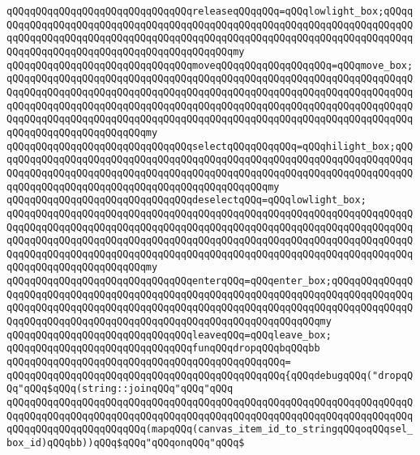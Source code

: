 \newline
\verb|qQQqqQQqqQQqqQQqqQQqqQQqqQQqqQQqreleaseqQQqqQQq=qQQqlowlight_box;qQQqqQQqqQQqqQQqqQQqqQQqqQQqqQQqqQQqqQQqqQQqqQQqqQQqqQQqqQQqqQQqqQQqqQQqqQQqqQQqqQQqqQQqqQQqqQQqqQQqqQQqqQQqqQQqqQQqqQQqqQQqqQQqqQQqqQQqqQQqqQQqqQQqqQQqqQQqqQQqqQQqqQQqqQQqqQQqqQQqqQQqmy|\newline
\verb|qQQqqQQqqQQqqQQqqQQqqQQqqQQqqQQqmoveqQQqqQQqqQQqqQQqqQQq=qQQqmove_box;|\newline
\verb|qQQqqQQqqQQqqQQqqQQqqQQqqQQqqQQqqQQqqQQqqQQqqQQqqQQqqQQqqQQqqQQqqQQqqQQqqQQqqQQqqQQqqQQqqQQqqQQqqQQqqQQqqQQqqQQqqQQqqQQqqQQqqQQqqQQqqQQqqQQqqQQqqQQqqQQqqQQqqQQqqQQqqQQqqQQqqQQqqQQqqQQqqQQqqQQqqQQqqQQqqQQqqQQqqQQqqQQqqQQqqQQqqQQqqQQqqQQqqQQqqQQqqQQqqQQqqQQqqQQqqQQqqQQqqQQqqQQqqQQqqQQqqQQqqQQqqQQqqQQqqQQqmy|\newline
\verb|qQQqqQQqqQQqqQQqqQQqqQQqqQQqqQQqselectqQQqqQQqqQQq=qQQqhilight_box;qQQqqQQqqQQqqQQqqQQqqQQqqQQqqQQqqQQqqQQqqQQqqQQqqQQqqQQqqQQqqQQqqQQqqQQqqQQqqQQqqQQqqQQqqQQqqQQqqQQqqQQqqQQqqQQqqQQqqQQqqQQqqQQqqQQqqQQqqQQqqQQqqQQqqQQqqQQqqQQqqQQqqQQqqQQqqQQqqQQqqQQqqQQqmy|\newline
\verb|qQQqqQQqqQQqqQQqqQQqqQQqqQQqqQQqdeselectqQQq=qQQqlowlight_box;|\newline
\verb|qQQqqQQqqQQqqQQqqQQqqQQqqQQqqQQqqQQqqQQqqQQqqQQqqQQqqQQqqQQqqQQqqQQqqQQqqQQqqQQqqQQqqQQqqQQqqQQqqQQqqQQqqQQqqQQqqQQqqQQqqQQqqQQqqQQqqQQqqQQqqQQqqQQqqQQqqQQqqQQqqQQqqQQqqQQqqQQqqQQqqQQqqQQqqQQqqQQqqQQqqQQqqQQqqQQqqQQqqQQqqQQqqQQqqQQqqQQqqQQqqQQqqQQqqQQqqQQqqQQqqQQqqQQqqQQqqQQqqQQqqQQqqQQqqQQqqQQqqQQqqQQqmy|\newline
\verb|qQQqqQQqqQQqqQQqqQQqqQQqqQQqqQQqenterqQQq=qQQqenter_box;qQQqqQQqqQQqqQQqqQQqqQQqqQQqqQQqqQQqqQQqqQQqqQQqqQQqqQQqqQQqqQQqqQQqqQQqqQQqqQQqqQQqqQQqqQQqqQQqqQQqqQQqqQQqqQQqqQQqqQQqqQQqqQQqqQQqqQQqqQQqqQQqqQQqqQQqqQQqqQQqqQQqqQQqqQQqqQQqqQQqqQQqqQQqqQQqqQQqqQQqqQQqqQQqmy|\newline
\verb|qQQqqQQqqQQqqQQqqQQqqQQqqQQqqQQqleaveqQQq=qQQqleave_box;|\newline
\newline
\verb|qQQqqQQqqQQqqQQqqQQqqQQqqQQqqQQqfunqQQqdropqQQqbqQQqbb|\newline
\verb|qQQqqQQqqQQqqQQqqQQqqQQqqQQqqQQqqQQqqQQqqQQqqQQq=|\newline
\verb|qQQqqQQqqQQqqQQqqQQqqQQqqQQqqQQqqQQqqQQqqQQqqQQq{qQQqdebugqQQq("dropqQQq"qQQq$qQQq(string::joinqQQq"qQQq"qQQq|\newline
\verb|qQQqqQQqqQQqqQQqqQQqqQQqqQQqqQQqqQQqqQQqqQQqqQQqqQQqqQQqqQQqqQQqqQQqqQQqqQQqqQQqqQQqqQQqqQQqqQQqqQQqqQQqqQQqqQQqqQQqqQQqqQQqqQQqqQQqqQQqqQQqqQQqqQQqqQQqqQQqqQQqqQQq(mapqQQq(canvas_item_id_to_stringqQQqoqQQqsel_box_id)qQQqbb))qQQq$qQQq"qQQqonqQQq"qQQq$|\newline

